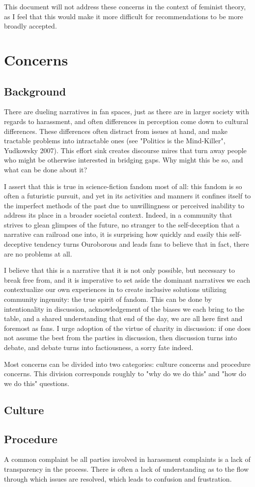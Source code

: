 \documentclass{article}
\begin{document}
This document will not address these concerns in the context of feminist theory, as I feel that this would make it more difficult for recommendations to be more broadly accepted.

\section{Concerns}
\subsection{Background}
There are dueling narratives in fan spaces, just as there are in larger society with regards to harassment, and often differences in perception come down to cultural differences. These differences often distract from issues at hand, and make tractable problems into intractable ones (see "Politics is the Mind-Killer", Yudkowsky 2007). This effort sink creates discourse mires that turn away people who might be otherwise interested in bridging gaps. Why might this be so, and what can be done about it?

I assert that this is true in science-fiction fandom most of all: this fandom is so often a futuristic pursuit, and yet in its activities and manners it confines itself to the imperfect methods of the past due to unwillingness or perceived inability to address its place in a broader societal context. Indeed, in a community that strives to glean glimpses of the future, no stranger to the self-deception that a narrative can railroad one into, it is surprising how quickly and easily this self-deceptive tendency turns Ouroborous and leads fans to believe that in fact, there are no problems at all.

I believe that this is a narrative that it is not only possible, but necessary to break free from, and it is imperative to set aside the dominant narratives we each contextualize our own experiences in to create inclusive solutions utilizing community ingenuity: the true spirit of fandom. This can be done by intentionality in discussion, acknowledgement of the biases we each bring to the table, and a shared understanding that end of the day, we are all here first and foremost as fans. I urge adoption of the virtue of charity in discussion: if one does not assume the best from the parties in discussion, then discussion turns into debate, and debate turns into factiousness, a sorry fate indeed.

Most concerns can be divided into two categories: culture concerns and procedure concerns. This division corresponds roughly to "why do we do this" and "how do we do this" questions.

\subsection{Culture}
\subsection{Procedure}
A common complaint be all parties involved in harassment complaints is a lack of transparency in the process. There is often a lack of understanding as to the flow through which issues are resolved, which leads to confusion and frustration.
\end{document}
